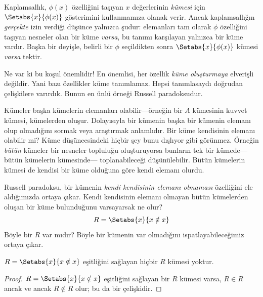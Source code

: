 


Kaplamsallık, $\phi(x)$ özelliğini taşıyan $x$ değerlerinin \emph{kümesi} için
$\Setabs{x}{\phi(x)}$ gösterimini kullanmamıza olanak verir. Ancak
kaplamsallığın \emph{gerçekte} izin verdiği düşünce yalnızca şudur:
elemanları tam olarak $\phi$ özelliğini taşıyan nesneler olan bir küme
\emph{varsa}, bu tanımı karşılayan yalnızca bir küme vardır. Başka bir deyişle,
belirli bir $\phi$ seçildikten sonra $\Setabs{x}{\phi(x)}$ kümesi \emph{varsa}
tektir.

Ne var ki bu koşul önemlidir!{} En önemlisi, her özellik \emph{küme
oluşturmaya} elverişli değildir. Yani bazı özellikler küme tanımlamaz. Hepsi
tanımlasaydı doğrudan çelişkilere varırdık. Bunun en ünlü örneği Russell
paradoksudur.

Kümeler başka kümelerin elemanları olabilir---örneğin bir $A$ kümesinin
kuvvet kümesi, kümelerden oluşur. Dolayısıyla bir kümenin başka bir kümenin
elemanı olup olmadığını sormak veya araştırmak anlamlıdır. Bir küme kendisinin
elemanı olabilir mi? Küme düşüncesindeki hiçbir şey bunu
dışlıyor gibi görünmez. Örneğin \emph{bütün} kümeler bir nesneler topluluğu
oluşturuyorsa bunların tek bir kümede---bütün kümelerin kümesinde---
toplanabileceği düşünülebilir. Bütün kümelerin kümesi de kendisi bir küme
olduğuna göre kendi elemanı olurdu.

Russell paradoksu, bir kümenin \emph{kendi kendisinin elemanı olmaması}
özelliğini ele aldığımızda ortaya çıkar. Kendi kendisinin elemanı olmayan bütün kümelerden
oluşan bir küme
bulunduğunu varsayarsak ne olur?
\[
R = \Setabs{x}{x \notin x}
\]
Böyle bir $R$ var mıdır? Böyle bir kümenin var olmadığını
ispatlayabileceğimiz ortaya çıkar.

\begin{thm}
	$R = \Setabs{x}{x \notin x}$ eşitliğini sağlayan hiçbir $R$ kümesi yoktur.
\end{thm}

\begin{proof}
$R = \Setabs{x}{x \notin x}$ eşitliğini sağlayan bir $R$ kümesi varsa,
$R \in R$ ancak ve ancak $R \notin R$ olur; bu da bir çelişkidir.
\end{proof}

